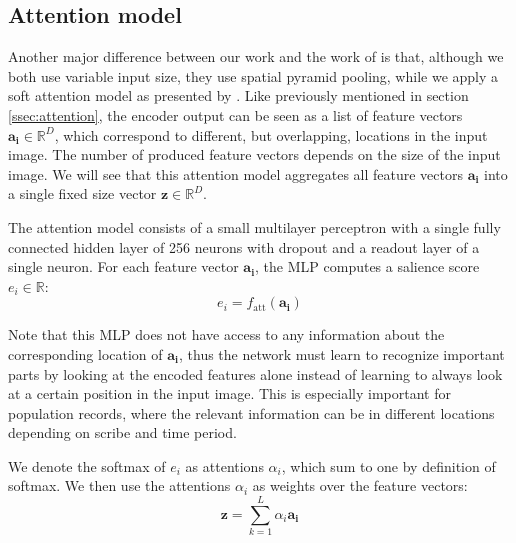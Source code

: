 


\subsection{Attention model}

Another major difference between our work and the work of \textcite{FornesCnnCategorization} is that, although we both use variable input size, they use spatial pyramid pooling, while we apply a soft attention model as presented by \textcite{machine_translation_attention}.
Like previously mentioned in section \ref{ssec:attention}, the encoder output can be seen as a list of feature vectors $\mathbf{a_i} \in \mathbb{R}^D$, which correspond to different, but overlapping, locations in the input image. The number of produced feature vectors depends on the size of the input image. We will see that this attention model aggregates all feature vectors $\mathbf{a_i}$ into a single fixed size vector $\mathbf{z} \in \mathbb{R}^D$.

The attention model consists of a small multilayer perceptron with a single fully connected hidden layer of 256 neurons with dropout and a readout layer of a single neuron.
For each feature vector $\mathbf{a_i}$, the MLP computes a salience score $e_i \in \mathbb{R}$:
\[
e_i = f_\text{att}(\mathbf{a_i})
\]

Note that this MLP does not have access to any information about the corresponding location of $\mathbf{a_i}$, thus the network must learn to recognize important parts by looking at the encoded features alone instead of learning to always look at a certain position in the input image. This is especially important for population records, where the relevant information can be in different locations depending on scribe and time period.


We denote the softmax of $e_i$ as attentions $\alpha_i$, which sum to one by definition of softmax.
We then use the attentions $\alpha_i$ as weights over the feature vectors:
\[
\mathbf{z} = \sum_{k=1}^L \alpha_i \mathbf{a_i}
\]


